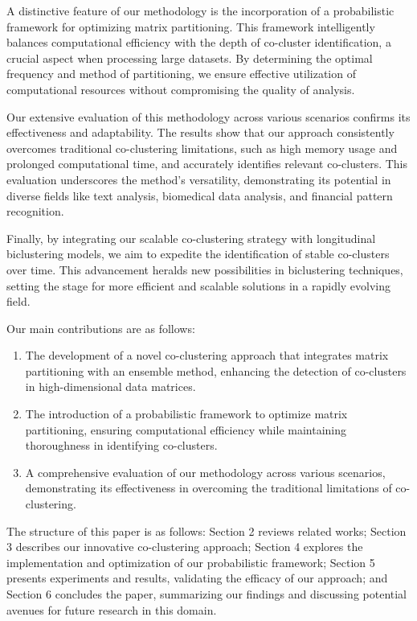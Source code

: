 A distinctive feature of our methodology is the incorporation of a probabilistic framework for optimizing matrix partitioning. This framework intelligently balances computational efficiency with the depth of co-cluster identification, a crucial aspect when processing large datasets. By determining the optimal frequency and method of partitioning, we ensure effective utilization of computational resources without compromising the quality of analysis.

Our extensive evaluation of this methodology across various scenarios confirms its effectiveness and adaptability. The results show that our approach consistently overcomes traditional co-clustering limitations, such as high memory usage and prolonged computational time, and accurately identifies relevant co-clusters. This evaluation underscores the method's versatility, demonstrating its potential in diverse fields like text analysis, biomedical data analysis, and financial pattern recognition.

Finally, by integrating our scalable co-clustering strategy with longitudinal biclustering models, we aim to expedite the identification of stable co-clusters over time. This advancement heralds new possibilities in biclustering techniques, setting the stage for more efficient and scalable solutions in a rapidly evolving field.

Our main contributions are as follows:

\begin{enumerate}
    \item The development of a novel co-clustering approach that integrates matrix partitioning with an ensemble method, enhancing the detection of co-clusters in high-dimensional data matrices.
    \item The introduction of a probabilistic framework to optimize matrix partitioning, ensuring computational efficiency while maintaining thoroughness in identifying co-clusters.
    \item A comprehensive evaluation of our methodology across various scenarios, demonstrating its effectiveness in overcoming the traditional limitations of co-clustering.
\end{enumerate}

The structure of this paper is as follows: Section 2 reviews related works; Section 3 describes our innovative co-clustering approach; Section 4 explores the implementation and optimization of our probabilistic framework; Section 5 presents experiments and results, validating the efficacy of our approach; and Section 6 concludes the paper, summarizing our findings and discussing potential avenues for future research in this domain.
